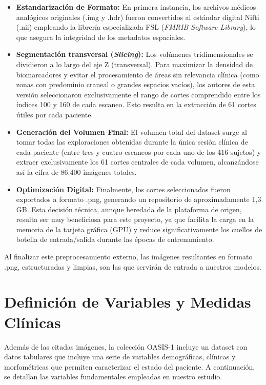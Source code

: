\documentclass[12pt, oneside, english, spanish]{book}
\begin{document}
\begin{itemize}
	\item \textbf{Estandarización de Formato:} En primera instancia, los archivos médicos analógicos originales (.img y .hdr) fueron convertidos al estándar digital Nifti (.nii) empleando la librería especializada FSL (\textit{FMRIB Software Library}), lo que asegura la integridad de los metadatos espaciales.
	
	\item \textbf{Segmentación transversal (\textit{Slicing}):} Los volúmenes tridimensionales se dividieron a lo largo del eje Z (transversal). Para maximizar la densidad de biomarcadores y evitar el procesamiento de áreas sin relevancia clínica (como zonas con predominio craneal o grandes espacios vacíos), los autores de esta versión seleccionaron exclusivamente el rango de cortes comprendido entre los índices 100 y 160 de cada escaneo. Esto resulta en la extracción de 61 cortes útiles por cada paciente.
	
	\item \textbf{Generación del Volumen Final:} El volumen total del dataset surge al tomar todas las exploraciones obtenidas durante la única sesión clínica de cada paciente (entre tres y cuatro escaneos por cada uno de los 416 sujetos) y extraer exclusivamente los 61 cortes centrales de cada volumen, alcanzándose así la cifra de 86.400 imágenes totales.
	
	\item \textbf{Optimización Digital:} Finalmente, los cortes seleccionados fueron exportados a formato .png, generando un repositorio de aproximadamente 1,3 GB. Esta decisión técnica, aunque heredada de la plataforma de origen, resulta ser muy beneficiosa para este proyecto, ya que facilita la carga en la memoria de la tarjeta gráfica (GPU) y reduce significativamente los cuellos de botella de entrada/salida durante las épocas de entrenamiento.
\end{itemize}

Al finalizar este preprocesamiento externo, las imágenes resultantes en formato .png, estructuradas y limpias, son las que servirán de entrada a nuestros modelos.

\section{Definición de Variables y Medidas Clínicas} \label{sec:variables_clinicas}

Además de las citadas imágenes, la colección OASIS-1 incluye un dataset con datos tabulares que incluye una serie de variables demográficas, clínicas y morfométricas que permiten caracterizar el estado del paciente. A continuación, se detallan las variables fundamentales empleadas en nuestro estudio.
\end{document}
